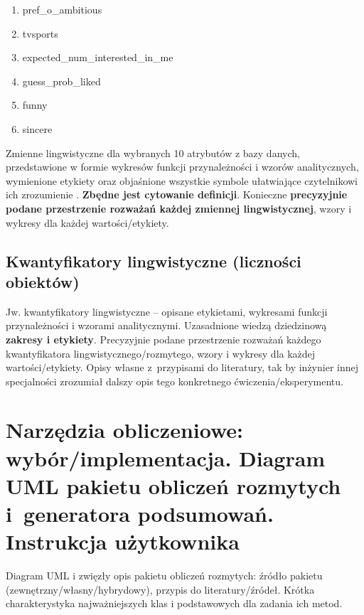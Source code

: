 \documentclass{classrep}
\begin{document}
\begin{enumerate}
  \item pref\_o\_ambitious
  \item tvsports 
  \item expected\_num\_interested\_in\_me
  \item guess\_prob\_liked 
  \item funny
  \item sincere 
\end{enumerate}


Zmienne lingwistyczne dla wybranych 10 atrybutów z bazy danych, przedstawione w
formie wykresów funkcji przynależności i wzorów analitycznych, wymienione etykiety oraz objaśnione wszystkie
symbole ułatwiające czytelnikowi ich zrozumienie \cite{zadrozny06}. {\bf Zbędne jest
cytowanie definicji}. Konieczne {\bf precyzyjnie podane przestrzenie rozważań każdej
zmiennej lingwistycznej}, wzory i wykresy dla każdej wartości/etykiety.

\subsection{Kwantyfikatory lingwistyczne (liczności obiektów)}
Jw. kwantyfikatory lingwistyczne -- opisane etykietami, wykresami funkcji
przynależności i wzorami analitycznymi. Uzasadnione wiedzą dziedzinową  
{\bf zakresy i etykiety}. Precyzyjnie podane przestrzenie rozważań każdego kwantyfikatora 
lingwistycznego/rozmytego, wzory i wykresy dla każdej wartości/etykiety. Opisy własne z~przypisami do literatury, tak by inżynier innej specjalności zrozumiał dalszy
opis tego konkretnego ćwiczenia/eksperymentu.  


\section{Narzędzia obliczeniowe: wybór/implementacja. Diagram UML pakietu
obliczeń rozmytych i~generatora podsumowań. Instrukcja użytkownika}

Diagram UML i zwięzły opis pakietu obliczeń rozmytych: źródło pakietu
(zewnętrzny/własny/hybrydowy), przypis do literatury/źródeł. Krótka charakterystyka
najważniejszych klas i podstawowych dla zadania ich metod. \\
\end{document}
